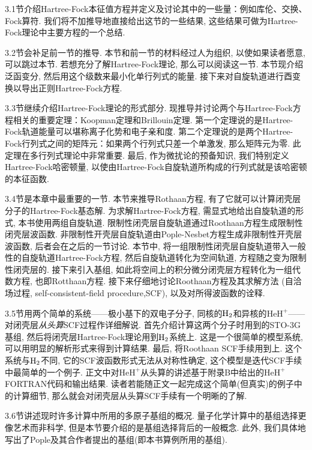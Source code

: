3.1节介绍Hartree-Fock本征值方程并定义及讨论其中的一些量：例如库伦、交换、Fock算符. 
我们将不加推导地直接给出这节的一些结果, 这些结果可做为Hartree-Fock理论中主要方程的一个总结.

3.2节会补足前一节的推导. 本节和前一节的材料经过人为组织, 以使如果读者愿意, 可以跳过本节. 
若想充分了解Hartree-Fock理论, 那么可以阅读这一节. 本节现介绍泛函变分, 然后用这个级数来最小化单行列式的能量. 
接下来对自旋轨道进行酉变换以导出正则Hartree-Fock方程.

3.3节继续介绍Hartree-Fock理论的形式部分. 
现推导并讨论两个与Hartree-Fock方程相关的重要定理：Koopman定理和Brillouin定理.
第一个定理说的是Hartree-Fock轨道能量可以堪称离子化势和电子亲和度. 
第二个定理说的是两个Hartree-Fock行列式之间的矩阵元：如果两个行列式只差一个单激发, 那么矩阵元为零. 
此定理在多行列式理论中非常重要. 
最后, 作为微扰论的预备知识, 
我们特别定义Hartree-Fock哈密顿量,
以使由Hartree-Fock自旋轨道所构成的行列式就是该哈密顿的本征函数.

3.4节是本章中最重要的一节. 
本节来推导Rothaan方程, 
有了它就可以计算闭壳层分子的Hartree-Fock基态解. 
为求解Hartree-Fock方程, 
需显式地给出自旋轨道的形式, 
本书使用两组自旋轨道.
限制性闭壳层自旋轨道通过Roothaan方程生成限制性闭壳层波函数. 
非限制性开壳层自旋轨道由Pople-Nesbet方程生成非限制性开壳层波函数, 
后者会在之后的一节讨论. 
本节中, 将一组限制性闭壳层自旋轨道带入一般性的自旋轨道Hartree-Fock方程, 
然后自旋轨道转化为空间轨道, 
方程随之变为限制性闭壳层的. 
接下来引入基组, 
如此将空间上的积分微分闭壳层\hft 方程转化为一组代数方程, 
也即Rotthaan方程.
接下来仔细地讨论Roothaan方程及其求解方法
(自洽场过程, self-consistent-field procedure,SCF), 
以及对所得波函数的诠释.

3.5节用两个简单的系统——极小基下的双电子分子, 同核的$\mathrm{H}_2$和异核的$\mathrm{HeH}^+$——对闭壳层\emph{从头算}SCF过程作详细解说. 
首先介绍计算这两个分子时用到的STO-3G基组, 然后将闭壳层Hartree-Fock理论用到$\mathrm{H}_2$系统上. 
这是一个很简单的模型系统, 可以用明显的解析形式来得到计算结果. 
最后, 将Roothaan SCF手续用到上. 
这个系统与$\mathrm{H}_2$不同, 它的SCF波函数形式无法从对称性确定, 
这个模型是迭代SCF手续中最简单的一个例子. 
正文中对$\mathrm{HeH}^+$从头算的讲述基于附录B中给出的$\mathrm{HeH}^+$FORTRAN代码和输出结果. 
读者若能随正文一起完成这个简单(但真实)的例子中的计算细节, 那么就会对闭壳层从头算SCF手续有一个明晰的了解.

3.6节讲述现时许多计算中所用的多原子基组的概况. 
量子化学计算中的基组选择更像艺术而非科学, 
但是本节要介绍的是基组选择背后的一般概念. 
此外, 我们具体地写出了Pople及其合作者提出的基组(即本书算例所用的基组).  

